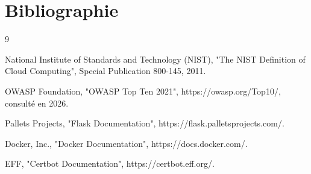\chapter*{Bibliographie}

\begin{thebibliography}{9}

National Institute of Standards and Technology (NIST),
"The NIST Definition of Cloud Computing",
Special Publication 800-145, 2011.

OWASP Foundation,
"OWASP Top Ten 2021",
https://owasp.org/Top10/, consulté en 2026.

Pallets Projects,
"Flask Documentation",
https://flask.palletsprojects.com/.

Docker, Inc.,
"Docker Documentation",
https://docs.docker.com/.

EFF,
"Certbot Documentation",
https://certbot.eff.org/.

\end{thebibliography}
